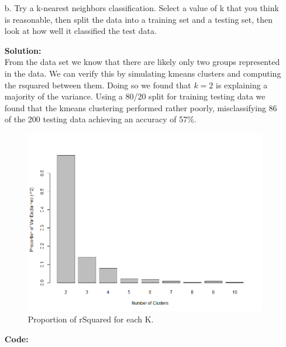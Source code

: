 \documentclass[12pt]{article}
\makeatletter
\theoremstyle{homework}
\newenvironment{exercise}[1]
{\def\@currentlabel{#1}\exercisecore}
{\endexercisecore}
\newcommand{\localhead}[1]{\par\smallskip\noindent\textbf{#1}\nobreak\\}%
\newcommand\solution{\localhead{Solution:}}
\makeatother
\begin{document}
\begin{exercise}{1}
\begin{enumerate}
    \item[b.] Try a k-nearest neighbors classification. Select a value of k that you think is reasonable, then split the data into a training set and a testing set, then look at how well it classified the test data.\\
    \solution From the data set we know that there are likely only two groups represented in the data. We can verify this by simulating kmeans clusters and computing the rsquared between them. Doing so we found that $k = 2$
    is explaining a majority of the variance. Using a 80/20 split for training testing data we found that the kmeans clustering performed rather poorly, misclassifying 86 of the 200 testing data achieving an accuracy of 57\%.
      \begin{figure}[H]
        \begin{center}
          \caption{Proportion of rSquared for each K.}
        \includegraphics[width = \textwidth]{Rplot01.png}
        \end{center}
      \end{figure}
        \textbf{Code:}
        \begin{center}
         
        \end{center}
        \vspace{.15in}


\end{enumerate}
\end{exercise}
\end{document}

